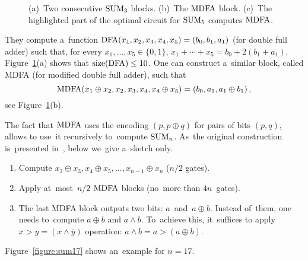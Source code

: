 \begin{figure}
\begin{center}
\end{center}
\caption{(a)~Two consecutive $\operatorname{SUM}_3$ blocks. (b)~The $\operatorname{MDFA}$ block. (c)~The highlighted part of the optimal circuit
for $\operatorname{SUM}_5$ computes $\operatorname{MDFA}$.}
\label{figure:mdfa}
\end{figure}
%
They compute a~function $\operatorname{DFA}(x_1,x_2,x_3,x_4,x_5)=(b_0, b_1, a_1)$
(for double full adder)
such that, for every $x_1, \dotsc, x_5 \in \{0,1\}$,
$x_1+\dotsb+x_5=b_0+2(b_1+a_1)$.
Figure~\ref{figure:mdfa}(a) shows that $\operatorname{size}(\operatorname{DFA}) \le 10$.
One can construct a~similar block, called MDFA (for modified double full adder), such that
\[\operatorname{MDFA}(x_1 \oplus x_2, x_2, x_3, x_4, x_4 \oplus x_5)=(b_0, a_1, a_1 \oplus b_1) \, ,\]
see Figure~\ref{figure:mdfa}(b).

The fact that $\operatorname{MDFA}$ uses the encoding $(p, p \oplus q)$ for pairs of bits $(p,q)$, allows to use~it recursively
to~compute $\operatorname{SUM}_n$. As~the original construction is~presented in~\cite{DBLP:journals/ipl/DemenkovKKY10}, below we~give a~sketch
only.
\begin{enumerate}
    \item Compute $x_2 \oplus x_3, x_4 \oplus x_5, \dotsc, x_{n-1} \oplus x_n$ ($n/2$ gates).
    \item Apply at~most~$n/2$ $\operatorname{MDFA}$ blocks (no~more than $4n$~gates).
    \item The last MDFA block outputs two bits: $a$~and~$a\oplus b$. Instead of~them, one needs to~compute $a \oplus b$ and $a \land b$. To~achieve this,
    it~suffices to apply $x>y=(x \land \overline{y})$ operation:
    \(a \land b = a>(a \oplus b)\).
\end{enumerate}
Figure~\ref{figure:sum17} shows an~example for $n=17$.

